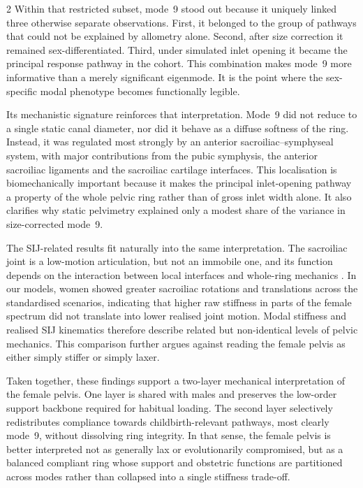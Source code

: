 \documentclass[openacc]{rsproca_new}
\begin{document}
\begin{multicols}{2}
Within that restricted subset, mode~9 stood out because it uniquely linked three otherwise separate observations. First, it belonged to the group of pathways that could not be explained by allometry alone. Second, after size correction it remained sex-differentiated. Third, under simulated inlet opening it became the principal response pathway in the cohort. This combination makes mode~9 more informative than a merely significant eigenmode. It is the point where the sex-specific modal phenotype becomes functionally legible.

Its mechanistic signature reinforces that interpretation. Mode~9 did not reduce to a single static canal diameter, nor did it behave as a diffuse softness of the ring. Instead, it was regulated most strongly by an anterior sacroiliac--symphyseal system, with major contributions from the pubic symphysis, the anterior sacroiliac ligaments and the sacroiliac cartilage interfaces. This localisation is biomechanically important because it makes the principal inlet-opening pathway a property of the whole pelvic ring rather than of gross inlet width alone. It also clarifies why static pelvimetry explained only a modest share of the variance in size-corrected mode~9.

The SIJ-related results fit naturally into the same interpretation. The sacroiliac joint is a low-motion articulation, but not an immobile one, and its function depends on the interaction between local interfaces and whole-ring mechanics \cite{Vleeming2012,Kiapour2019,ChoKwak2020}. In our models, women showed greater sacroiliac rotations and translations across the standardised scenarios, indicating that higher raw stiffness in parts of the female spectrum did not translate into lower realised joint motion. Modal stiffness and realised SIJ kinematics therefore describe related but non-identical levels of pelvic mechanics. This comparison further argues against reading the female pelvis as either simply stiffer or simply laxer.

Taken together, these findings support a two-layer mechanical interpretation of the female pelvis. One layer is shared with males and preserves the low-order support backbone required for habitual loading. The second layer selectively redistributes compliance towards childbirth-relevant pathways, most clearly mode~9, without dissolving ring integrity. In that sense, the female pelvis is better interpreted not as generally lax or evolutionarily compromised, but as a balanced compliant ring whose support and obstetric functions are partitioned across modes rather than collapsed into a single stiffness trade-off.


\end{multicols}
\end{document}
